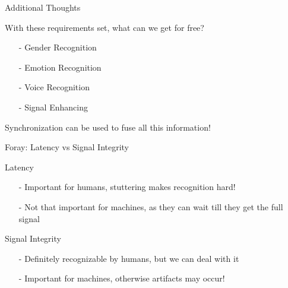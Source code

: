 \documentclass{beamer}
\begin{document}
	
	\begin{frame}{Additional Thoughts}
		\begin{alertblock}{With these requirements set, what can we get for free?}
			\pause
			\begin{itemize}
				\item[-] Gender Recognition
				\item[-] Emotion Recognition
				\item[-] Voice Recognition
				\item[-] Signal Enhancing
			\end{itemize}
			\pause
			Synchronization can be used to fuse all this information!
		\end{alertblock}
	\end{frame}
	
	\begin{frame}{Foray: Latency vs Signal Integrity}
		\begin{alertblock}{Latency}
			\begin{itemize}
				\item[-] Important for humans, stuttering makes recognition hard!
				\item[-] Not that important for machines, as they can wait till they get the full signal
			\end{itemize}
		\end{alertblock}
		\pause
		\begin{alertblock}{Signal Integrity}
			\begin{itemize}
				\item[-] Definitely recognizable by humans, but we can deal with it
				\item[-] Important for machines, otherwise artifacts may occur!
			\end{itemize}
		\end{alertblock}
	\end{frame}
	
\end{document}
